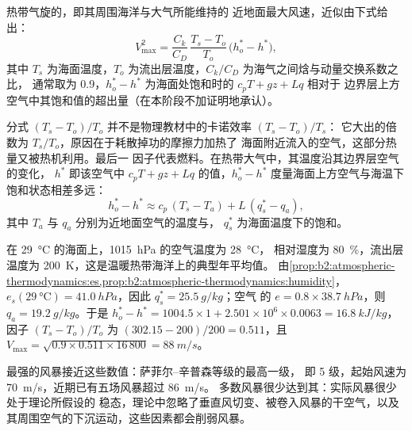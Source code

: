 \begin{proposition}[潜在强度]\label{prop:b2:weather-systems:pi}
热带气旋的\emph{}，即其周围海洋与大气所能维持的
近地面最大风速，近似由下式给出：
\[
  V_{\max}^2 = \frac{C_k}{C_D}\,\frac{T_s - T_o}{T_o}\,\bigl(h_o^* - h^*\bigr),
\]
其中 $T_s$ 为海面温度，$T_o$ 为流出层温度，$C_k/C_D$
为海气之间焓与动量交换系数之比，
通常取为 0.9，$h_o^* - h^*$ 为海面处饱和时的 $c_pT + gz + Lq$ 相对于
边界层上方空气中其饱和值的超出量（在本阶段不加证明地承认）。
\end{proposition}

分式 $(T_s - T_o)/T_o$ 并不是物理教材中的卡诺效率 $(T_s - T_o)/T_s$：
它大出的倍数为 $T_s/T_o$，原因在于耗散掉功的摩擦力加热了
海面附近流入的空气，这部分热量又被热机利用。最后一
因子代表燃料。在热带大气中，其温度沿其边界层空气的变化，
$h^*$ 即该空气中 $c_pT + gz + Lq$ 的值，$h_o^* - h^*$
度量海面上方空气与海温下饱和状态相差多远：
\[
  h_o^* - h^* \approx c_p\,(T_s - T_a) + L\,(q_s^* - q_a),
\]
其中 $T_a$ 与 $q_a$ 分别为近地面空气的温度与，
$q_s^*$ 为海面温度下的饱和。

\begin{example}[潜在强度示例]\label{ex:b2:weather-systems:pi}
在 \qty{29}{\celsius} 的海面上，\qty{1015}{hPa} 的空气温度为 \qty{28}{\celsius}，
相对湿度为 \qty{80}{\percent}，流出层温度为 \qty{200}{K}，这是温暖热带海洋上的典型年平均值。
由\cref{prop:b2:atmospheric-thermodynamics:es,prop:b2:atmospheric-thermodynamics:humidity}，
$e_s(\qty{29}{\celsius}) = \qty{41.0}{hPa}$，因此 $q_s^* = \qty{25.5}{g/kg}$；空气
的 $e = 0.8 \times \qty{38.7}{hPa}$，则 $q_a = \qty{19.2}{g/kg}$。于是 $h_o^* - h^* = 1004.5 \times
1 + 2.501 \times 10^6 \times 0.0063 = \qty{16.8}{kJ/kg}$，因子 $(T_s - T_o)/T_o$ 为
$(302.15 - 200)/200 = 0.511$，且 $V_{\max} = \sqrt{0.9 \times 0.511 \times 16\,800} =
\qty{88}{m/s}$。
\end{example}

最强的风暴接近这些数值：萨菲尔–辛普森等级的最高一级，
即 5 级，起始风速为 \qty{70}{m/s}，近期已有五场风暴超过 \qty{86}{m/s}。
多数风暴很少达到其：实际风暴很少处于理论所假设的
稳态，理论中忽略了垂直风切变、被卷入风暴的干空气，以及
其周围空气的下沉运动，这些因素都会削弱风暴。

